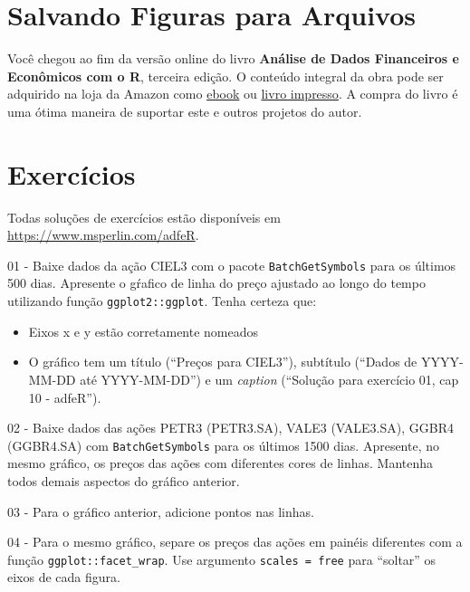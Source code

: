 \documentclass[
  11pt,
]{book}
\providecommand{\tightlist}{%
  \setlength{\itemsep}{0pt}\setlength{\parskip}{0pt}}
\newenvironment{pleasebuyit}
{\begin{noteblock}
		
	} {\end{noteblock}}
\begin{document}
\hypertarget{salvando-figuras-para-arquivos}{%
\section{Salvando Figuras para Arquivos}\label{salvando-figuras-para-arquivos}}

\begin{pleasebuyit}
Você chegou ao fim da versão online do livro \textbf{Análise de Dados
Financeiros e Econômicos com o R}, terceira edição. O conteúdo integral
da obra pode ser adquirido na loja da Amazon como
\href{https://www.amazon.com.br/dp/B08WNC27ZY}{ebook} ou
\href{https://www.amazon.com/dp/B08WP8CCDB}{livro impresso}. A compra do
livro é uma ótima maneira de suportar este e outros projetos do autor.
\end{pleasebuyit}

\hypertarget{exerc-figuras}{%
\section{Exercícios}\label{exerc-figuras}}

Todas soluções de exercícios estão disponíveis em \url{https://www.msperlin.com/adfeR}.

01 -
Baixe dados da ação CIEL3 com o pacote \texttt{BatchGetSymbols} para os últimos 500 dias. Apresente o gŕafico de linha do preço ajustado ao longo do tempo utilizando função \texttt{ggplot2::ggplot}. Tenha certeza que:

\begin{itemize}
\tightlist
\item
  Eixos x e y estão corretamente nomeados
\item
  O gráfico tem um título (``Preços para CIEL3''), subtítulo (``Dados de YYYY-MM-DD até YYYY-MM-DD'') e um \emph{caption} (``Solução para exercício 01, cap 10 - adfeR'').
\end{itemize}

02 -
Baixe dados das ações PETR3 (PETR3.SA), VALE3 (VALE3.SA), GGBR4 (GGBR4.SA) com \texttt{BatchGetSymbols} para os últimos 1500 dias. Apresente, no mesmo gráfico, os preços das ações com diferentes cores de linhas. Mantenha todos demais aspectos do gráfico anterior.

03 -
Para o gráfico anterior, adicione pontos nas linhas.

04 -
Para o mesmo gráfico, separe os preços das ações em painéis diferentes com a função \texttt{ggplot::facet\_wrap}. Use argumento \texttt{scales\ =\ \textquotesingle{}free\textquotesingle{}} para ``soltar'' os eixos de cada figura.
\end{document}
